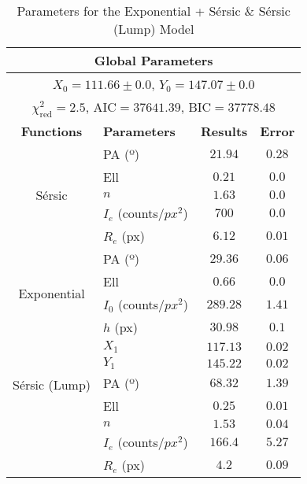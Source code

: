 

\begin{table}[!htb]
    \renewcommand{\thetable}{S1}
    \centering
    \begin{tabular}{|c|l|c|c|}
        \hline
        \multicolumn{4}{|c|}{\textbf{Global Parameters}} \\
        \hline
        \multicolumn{4}{|c|}{\(X_{0} = 111.66 \pm 0.0\), \(Y_{0} = 147.07 \pm 0.0\)} \\
        \hline
        \multicolumn{4}{|c|}{\(\chi^{2}_{\text{red}} = 2.5\), \(\text{AIC} = 37641.39\), \(\text{BIC} = 37778.48\)} \\
        \hline
        \textbf{Functions} & \textbf{Parameters} & \textbf{Results} & \textbf{Error} \\
        \hline
        \multirow{5}{*}{Sérsic} 
        & PA (º) & \(21.94\) & \(0.28\) \\
        & Ell & \(0.21\) & \(0.0\) \\
        & \(n\) & \(1.63\) & \(0.0\) \\
        & \(I_{e}\) (counts/\(px^{2}\)) & \(700\) & \(0.0\) \\
        & \(R_{e}\) (px) & \(6.12\) & \(0.01\) \\
        \hline
        \multirow{4}{*}{Exponential}
        & PA (º) & \(29.36\) & \(0.06\) \\
        & Ell & \(0.66\) & \(0.0\) \\
        & \(I_{0}\) (counts/\(px^{2}\)) & \(289.28\) & \(1.41\) \\
        & \(h\) (px) & \(30.98\) & \(0.1\) \\
        \hline
        \multirow{5}{*}{Sérsic (Lump)}
        & \(X_{1}\) & \(117.13\) & \(0.02\) \\
        & \(Y_{1}\) & \(145.22\) & \(0.02\) \\
        & PA (º) & \(68.32\) & \(1.39\) \\
        & Ell & \(0.25\) & \(0.01\) \\
        & \(n\) & \(1.53\) & \(0.04\) \\
        & \(I_{e}\) (counts/\(px^{2}\)) & \(166.4\) & \(5.27\) \\
        & \(R_{e}\) (px) & \(4.2\) & \(0.09\) \\
        \hline
    \end{tabular}
     \caption{Parameters for the Exponential + Sérsic \& Sérsic (Lump) Model}
    \label{tab:my_label}
\end{table}

